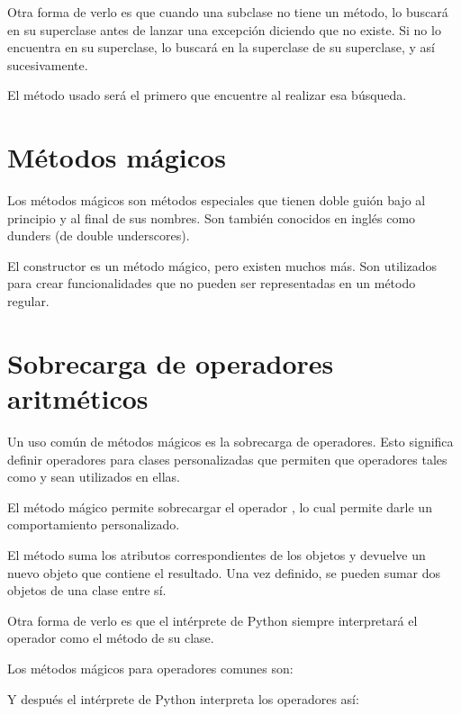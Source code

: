 Otra forma de verlo es que cuando una subclase no tiene un método, lo buscará en su superclase antes de lanzar una excepción diciendo que no existe.
Si no lo encuentra en su superclase, lo buscará en la superclase de su superclase, y así sucesivamente.
\medskip

El método usado será el primero que encuentre al realizar esa búsqueda.

\section{Métodos mágicos}

Los métodos mágicos son métodos especiales que tienen doble guión bajo al principio y al final de sus nombres.
Son también conocidos en inglés como dunders (de double underscores).
\medskip

El constructor  es un método mágico, pero existen muchos más.
Son utilizados para crear funcionalidades que no pueden ser representadas en un método regular.

\section{Sobrecarga de operadores aritméticos}

Un uso común de métodos mágicos es la sobrecarga de operadores.
Esto significa definir operadores para clases personalizadas que permiten que operadores tales como \ttt{+} y \ttt{*} sean utilizados en ellas.
\medskip

El método mágico  permite sobrecargar el operador \ttt{+}, lo cual permite darle un comportamiento personalizado.


El método  suma los atributos correspondientes de los objetos y devuelve un nuevo objeto que contiene el resultado.
Una vez definido, se pueden sumar dos objetos de una clase entre sí.
\medskip

Otra forma de verlo es que el intérprete de Python siempre interpretará el operador \ttt{+} como el método  de su clase.
\medskip

Los métodos mágicos para operadores comunes son:


Y después el intérprete de Python interpreta los operadores así:

